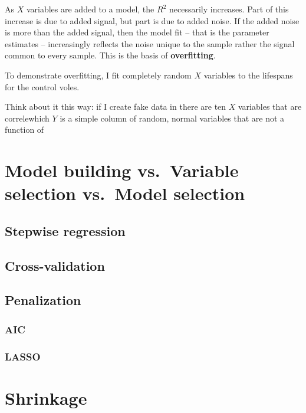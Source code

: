 \documentclass[]{book}
\begin{document}
As \(X\) variables are added to a model, the \(R^2\) necessarily
increases. Part of this increase is due to added signal, but part is due
to added noise. If the added noise is more than the added signal, then
the model fit -- that is the parameter estimates -- increasingly
reflects the noise unique to the sample rather the signal common to
every sample. This is the basis of \textbf{overfitting}.

To demonstrate overfitting, I fit completely random \(X\) variables to
the lifespans for the control voles.

Think about it this way: if I create fake data in there are ten \(X\)
variables that are correlewhich \(Y\) is a simple column of random,
normal variables that are not a function of

\section{Model building vs.~Variable selection vs.~Model
selection}\label{model-building-vs.variable-selection-vs.model-selection}

\subsection{Stepwise regression}\label{stepwise-regression}

\subsection{Cross-validation}\label{cross-validation}

\subsection{Penalization}\label{penalization}

\subsubsection{AIC}\label{aic}

\subsubsection{LASSO}\label{lasso}

\section{Shrinkage}\label{shrinkage}
\end{document}
